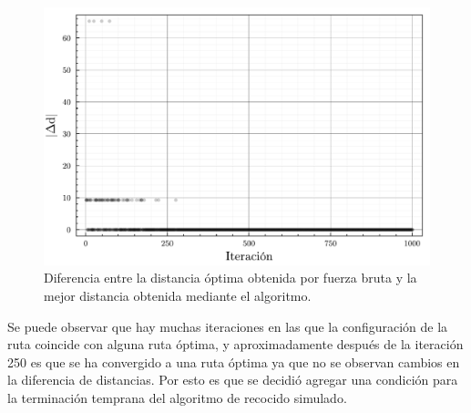 \begin{figure}[ht!]
    \centering
    \includegraphics[scale=0.5]{../figures/delta_distances_cities_05.pdf}
    \caption{Diferencia entre la distancia óptima obtenida por fuerza bruta y la mejor distancia obtenida mediante el algoritmo.}
    \label{fig:delta_distances_cities_05}
\end{figure}

Se puede observar que hay muchas iteraciones en las que la configuración de la ruta coincide con alguna ruta óptima, y aproximadamente después de la iteración 250 es que se ha convergido a una ruta óptima ya que no se observan cambios en la diferencia de distancias. Por esto es que se decidió agregar una condición para la terminación temprana del algoritmo de recocido simulado.

